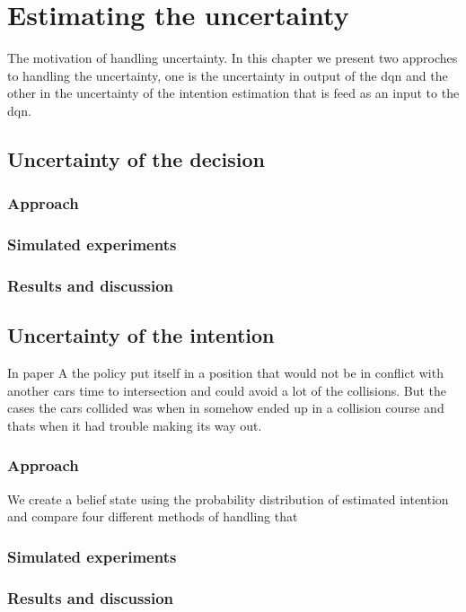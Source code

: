 \chapter{Estimating the uncertainty}
The motivation of handling uncertainty. In this chapter we present two approches to handling the uncertainty, one is the uncertainty in output of the \gls{dqn} and the other in the uncertainty of the intention estimation that is feed as an input to the \gls{dqn}.
\section{Uncertainty of the decision}
\subsection{Approach}
\subsection{Simulated experiments}
\subsection{Results and discussion}

\section{Uncertainty of the intention}
In paper A the policy put itself in a position that would not be in conflict with another cars time to intersection and could avoid a lot of the collisions. But the cases the cars collided was when in somehow ended up in a collision course and thats when it had trouble making its way out. 

\subsection{Approach}
We create a belief state using the probability distribution of estimated intention and compare four different methods of handling that 
\subsection{Simulated experiments}
\subsection{Results and discussion}